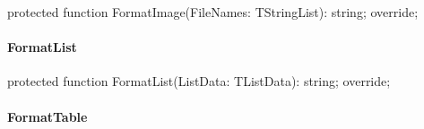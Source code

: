 \documentclass{report}
\newif\ifpdf
\begin{document}
\label{PasDoc_GenHtml.TGenericHTMLDocGenerator-FormatImage}
\begin{list}{}{
\setlength{\itemindent}{0cm}
\setlength{\listparindent}{0cm}
\setlength{\leftmargin}{\evensidemargin}
\addtolength{\leftmargin}{\tmplength}
\settowidth{\labelsep}{X}
\addtolength{\leftmargin}{\labelsep}
\setlength{\labelwidth}{\tmplength}
}
\item[\textbf{Declaration}\hfill]
\ifpdf
\begin{flushleft}
\fi
\begin{ttfamily}
protected function FormatImage(FileNames: TStringList): string; override;\end{ttfamily}

\ifpdf
\end{flushleft}
\fi

\end{list}
\paragraph*{FormatList}\hspace*{\fill}

\label{PasDoc_GenHtml.TGenericHTMLDocGenerator-FormatList}
\begin{list}{}{
\setlength{\itemindent}{0cm}
\setlength{\listparindent}{0cm}
\setlength{\leftmargin}{\evensidemargin}
\addtolength{\leftmargin}{\tmplength}
\settowidth{\labelsep}{X}
\addtolength{\leftmargin}{\labelsep}
\setlength{\labelwidth}{\tmplength}
}
\item[\textbf{Declaration}\hfill]
\ifpdf
\begin{flushleft}
\fi
\begin{ttfamily}
protected function FormatList(ListData: TListData): string; override;\end{ttfamily}

\ifpdf
\end{flushleft}
\fi

\end{list}
\paragraph*{FormatTable}\hspace*{\fill}
\end{document}

